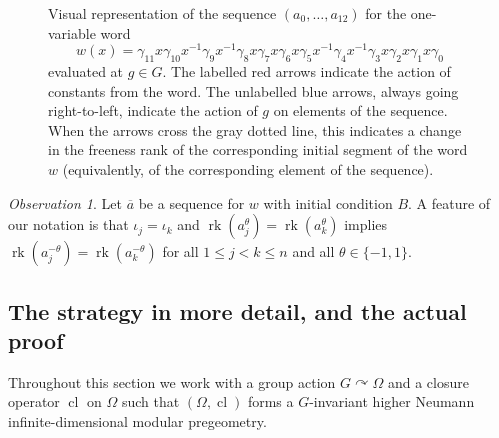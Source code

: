 \documentclass{article}
\theoremstyle{remark}
\newtheorem{observation}[theorem]{Observation}
\theoremstyle{definition}
\newtheorem{definition}[theorem]{Definition}
\def\acts{\curvearrowright}
\DeclareMathOperator{\rk}{rk}
\DeclareMathOperator{\cl}{cl}
\begin{document}
{\begin{figure}
\begin{tikzpicture}[scale=1.3]
\end{tikzpicture}
   
    \caption{Visual representation of the sequence $(a_0, \dots, a_{12})$ for the one-variable word
    \begin{equation*}
w(x)=\gamma_{11}x\gamma_{10}x^{-1}\gamma_9x^{-1}\gamma_8x\gamma_7x\gamma_6x\gamma_5x^{-1}\gamma_4x^{-1}\gamma_3x\gamma_2x\gamma_1x\gamma_0   
    \end{equation*}
    evaluated at $g\in G$. {The labelled red arrows indicate the action of constants from the word.} The unlabelled blue arrows, always going right-to-left, indicate the action of $g$ on elements of the sequence. When the arrows cross the gray dotted line, this indicates a change in the freeness rank of the corresponding initial segment of the word $w$ {(equivalently, of the corresponding element of the sequence).}
    }
    \label{fig:sequence}
\end{figure}


\begin{observation} Let $\overline{a}$ be a sequence for $w$ with initial condition $B$. A feature of our notation is that  {$\iota_j=\iota_k$ and} $\rk(a_j^\theta)=\rk(a_k^\theta)$ implies  $\rk(a_j^{-\theta})=\rk(a_k^{-\theta})$ for all {$1\leq j<k\leq n$ }
and all $\theta\in\{-1, 1\}$.  
\end{observation}













%
\subsection{The strategy in more detail, and the actual proof}



{Throughout this section we work with a group action  $G\acts\Omega$ and a %
 closure operator $\cl$ on $\Omega$ such that $(\Omega, \cl)$ forms a $G$-invariant higher Neumann infinite-dimensional modular pregeometry.}


}
\end{document}
